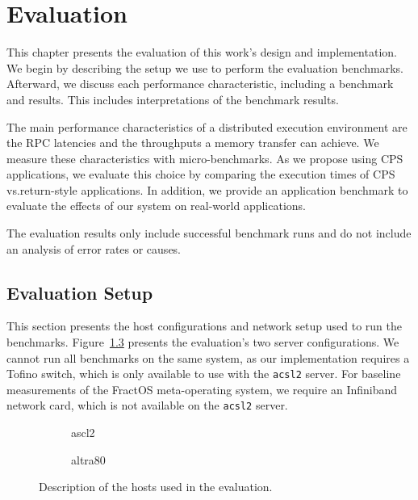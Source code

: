 \chapter{Evaluation}\label{chapter:evaluation}\thispagestyle{scrheadings}
This chapter presents the evaluation of this work's design and implementation. We begin by describing the setup we use to perform the evaluation benchmarks. Afterward, we discuss each performance characteristic, including a benchmark and results. This includes interpretations of the benchmark results.

The main performance characteristics of a distributed execution environment are the \ac{RPC} latencies and the throughputs a memory transfer can achieve. We measure these characteristics with micro-benchmarks. As we propose using \ac{CPS} applications, we evaluate this choice by comparing the execution times of \ac{CPS} vs.\@ return-style applications. In addition, we provide an application benchmark to evaluate the effects of our system on real-world applications.

The evaluation results only include successful benchmark runs and do not include an analysis of error rates or causes.
\section{Evaluation Setup}
This section presents the host configurations and network setup used to run the benchmarks.
Figure~\ref{eval:fig:setup} presents the evaluation's two server configurations. We cannot run all benchmarks on the same system, as our implementation requires a Tofino switch, which is only available to use with the \texttt{acsl2} server. For baseline measurements of the FractOS meta-operating system, we require an Infiniband network card, which is not available on the \texttt{acsl2} server.
\begin{figure}[H]
  \centering
  \begin{subfigure}[b]{0.49\textwidth}
    \centering
    
    \caption{\label{fig:acsl2} ascl2}
  \end{subfigure}
  \begin{subfigure}[b]{0.49\textwidth}
    \centering
    
    \caption{\label{fig:altra80} altra80}
  \end{subfigure}
  \caption{\label{eval:fig:setup} Description of the hosts used in the evaluation.}
\end{figure}

